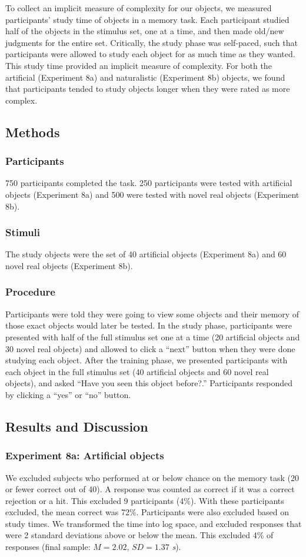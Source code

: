 \documentclass[man]{apa2}
\begin{document}
To collect an implicit measure of complexity for our objects, we measured participants' study time of objects in a memory task. Each participant studied half of the objects in the stimulus set, one at a time, and then made old/new judgments for the entire set. Critically, the study phase was self-paced, such that participants were allowed to study each object for as much time as they wanted. This study time provided an implicit measure of complexity. For both the artificial (Experiment 8a) and naturalistic (Experiment 8b) objects, we found that participants tended to study objects longer when they were rated as more complex.

\subsection{Methods}
\subsubsection{Participants} 750 participants completed the task. 250 participants were tested with artificial objects (Experiment 8a) and 500 were tested with novel real objects (Experiment 8b).
\subsubsection{Stimuli} The study objects were the set of 40 artificial objects (Experiment 8a) and 60 novel real objects (Experiment 8b).

\subsubsection{Procedure} Participants were told they were going to view some objects and their memory of those exact objects would later be tested. In the study phase, participants were presented with half of the full stimulus set one at a time (20 artificial objects and 30 novel real objects) and allowed to click a ``next'' button when they were done studying each object. After the training phase, we presented participants with each object in the full stimulus set (40 artificial objects and 60 novel real objects), and asked ``Have you seen this object before?.'' Participants responded by clicking a ``yes'' or ``no'' button.

\subsection{Results and Discussion }
\subsubsection{Experiment 8a: Artificial objects}
We excluded subjects who performed at or below chance on the memory task (20 or fewer correct out of 40). A response was counted as correct if it was a correct rejection or a hit. This excluded 9 participants (4\%). With these participants excluded, the mean correct was 72\%. Participants were also excluded based on study times. We transformed the time into log space, and excluded responses that were 2 standard deviations above or below the mean. This excluded 4\% of responses (final sample: $M = 2.02$, $SD = 1.37$ {\it s}).
\end{document}
